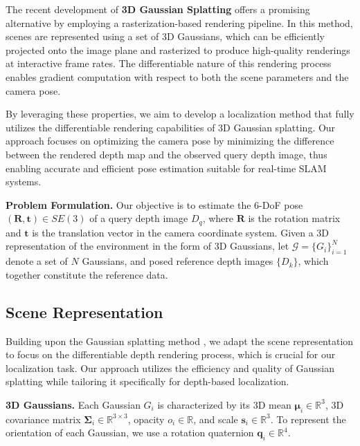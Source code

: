 \documentclass[twocolumn]{article}
\begin{document}
The recent development of \textbf{3D Gaussian Splatting}
\autocite{kerbl3DGaussianSplatting2023} offers a promising alternative
by employing a rasterization-based rendering pipeline. In this method,
scenes are represented using a set of 3D Gaussians, which can be
efficiently projected onto the image plane and rasterized to produce
high-quality renderings at interactive frame rates. The differentiable
nature of this rendering process enables gradient computation with
respect to both the scene parameters and the camera pose.

By leveraging these properties, we aim to develop a localization method
that fully utilizes the differentiable rendering capabilities of 3D
Gaussian splatting. Our approach focuses on optimizing the camera pose
by minimizing the difference between the rendered depth map and the
observed query depth image, thus enabling accurate and efficient pose
estimation suitable for real-time SLAM systems.

\textbf{Problem Formulation.} Our objective is to estimate the 6-DoF
pose \((\mathbf{R}, \mathbf{t}) \in SE(3)\) of a query depth image
\(D_q\), where \(\mathbf{R}\) is the rotation matrix and \(\mathbf{t}\)
is the translation vector in the camera coordinate system. Given a 3D
representation of the environment in the form of 3D Gaussians, let
\(\mathcal{G} = \{G_i\}_{i=1}^N\) denote a set of \(N\) Gaussians, and
posed reference depth images \(\{D_k\}\), which together constitute the
reference data.

\subsection{Scene Representation}\label{scene-representation}

Building upon the Gaussian splatting method
\autocite{kerbl3DGaussianSplatting2023}, we adapt the scene
representation to focus on the differentiable depth rendering process,
which is crucial for our localization task. Our approach utilizes the
efficiency and quality of Gaussian splatting while tailoring it
specifically for depth-based localization.

\textbf{3D Gaussians.} Each Gaussian \(G_i\) is characterized by its 3D
mean \(\boldsymbol{\mu}_i \in \mathbb{R}^3\), 3D covariance matrix
\(\boldsymbol{\Sigma}_i \in \mathbb{R}^{3\times3}\), opacity
\(o_i \in \mathbb{R}\), and scale \(\mathbf{s}_i \in \mathbb{R}^3\). To
represent the orientation of each Gaussian, we use a rotation quaternion
\(\mathbf{q}_i \in \mathbb{R}^4\).
\end{document}
